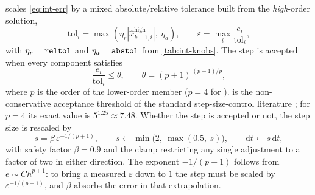 scales \cref{eq:int-err} by a mixed absolute/relative tolerance
built from the \emph{high}-order solution,
\begin{equation}
  \label{eq:int-tol}
  \mathrm{tol}_i = \max\!\left(
    \eta_r \left|\hat{x}^{\mathrm{high}}_{k+1,i}\right|,\ \eta_a
  \right),
  \qquad
  \varepsilon = \max_{i} \frac{e_i}{\mathrm{tol}_i},
\end{equation}
with $\eta_r = \texttt{reltol}$ and $\eta_a = \texttt{abstol}$ from
\cref{tab:int-knobs}. The step is accepted when every component satisfies
\begin{equation}
  \label{eq:int-accept}
  \frac{e_i}{\mathrm{tol}_i} \le \theta,
  \qquad
  \theta = (p+1)^{\,(p+1)/p},
\end{equation}
where $p$ is the order of the lower-order member ($p = 4$ for ).
 is the non-conservative acceptance threshold of the
standard step-size-control literature \citep[Ch.~II.4]{hairer1993}; for $p=4$ its exact value is
$5^{1.25} \approx 7.48$. Whether the step is accepted or not, the step size is
rescaled by
\begin{equation}
  \label{eq:int-scale}
  s = \beta\,\varepsilon^{-1/(p+1)},
  \qquad
  s \leftarrow \min\big(2,\ \max(0.5,\ s)\big),
  \qquad
  \mathrm{d}t \leftarrow s\,\mathrm{d}t,
\end{equation}
with safety factor $\beta = 0.9$ and the clamp restricting any single
adjustment to a factor of two in either direction. The exponent $-1/(p+1)$
follows from $e \sim C h^{p+1}$: to bring a measured $\varepsilon$ down to $1$
the step must be scaled by $\varepsilon^{-1/(p+1)}$, and $\beta$ absorbs the
error in that extrapolation.

